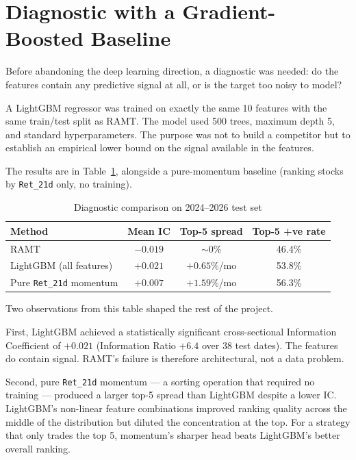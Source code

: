 \documentclass[conference]{IEEEtran}
\begin{document}
\section{Diagnostic with a Gradient-Boosted Baseline}

Before abandoning the deep learning direction, a diagnostic was needed: do the features contain any predictive signal at all, or is the target too noisy to model?

A LightGBM regressor was trained on exactly the same 10 features with the same train/test split as RAMT. The model used 500 trees, maximum depth 5, and standard hyperparameters. The purpose was not to build a competitor but to establish an empirical lower bound on the signal available in the features.

The results are in Table~\ref{tab:diagnostic}, alongside a pure-momentum baseline (ranking stocks by \texttt{Ret\_21d} only, no training).

\begin{table}[htbp]
\caption{Diagnostic comparison on 2024--2026 test set}
\label{tab:diagnostic}
\centering
\begin{tabular}{lccc}
\toprule
\textbf{Method} & \textbf{Mean IC} & \textbf{Top-5 spread} & \textbf{Top-5 +ve rate} \\
\midrule
RAMT & $-0.019$ & $\sim$0\% & 46.4\% \\
LightGBM (all features) & $+0.021$ & $+0.65\%$/mo & 53.8\% \\
Pure \texttt{Ret\_21d} momentum & $+0.007$ & $+1.59\%$/mo & 56.3\% \\
\bottomrule
\end{tabular}
\end{table}

Two observations from this table shaped the rest of the project.

First, LightGBM achieved a statistically significant cross-sectional Information Coefficient of $+0.021$ (Information Ratio $+6.4$ over 38 test dates). The features do contain signal. RAMT's failure is therefore architectural, not a data problem.

Second, pure \texttt{Ret\_21d} momentum --- a sorting operation that required no training --- produced a larger top-5 spread than LightGBM despite a lower IC. LightGBM's non-linear feature combinations improved ranking quality across the middle of the distribution but diluted the concentration at the top. For a strategy that only trades the top 5, momentum's sharper head beats LightGBM's better overall ranking.
\end{document}
